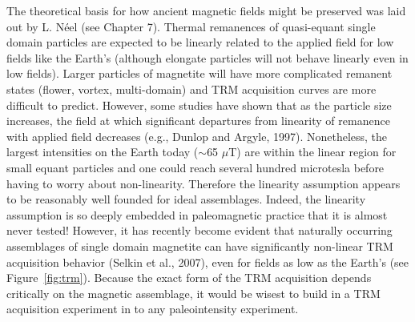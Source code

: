   The  theoretical basis for how ancient magnetic fields might be preserved was laid out by   L.  N\'eel  (see Chapter 7).  Thermal remanences of quasi-equant single domain particles are expected to be linearly related to the applied field for low fields like the Earth's (although elongate particles will not behave linearly even in low fields).   Larger particles of magnetite   will have more complicated remanent states (flower, vortex, multi-domain)  and  TRM acquisition curves are more difficult to predict.  However, some studies have shown that as the particle size increases,  the field at which significant departures from linearity of remanence with applied field decreases (e.g., 
  Dunlop and Argyle,  1997).   \nocite{dunlop97b}   Nonetheless, the largest intensities on the Earth today ($\sim$65 $\mu$T) are within the linear region  for small equant particles and one could  reach several hundred microtesla before having to worry about non-linearity.    Therefore the linearity assumption  appears to be reasonably well founded for ideal assemblages.  Indeed, the linearity assumption is so deeply embedded in paleomagnetic practice that it is almost never tested! However,  it has recently become evident that naturally occurring assemblages of single domain magnetite can have significantly non-linear TRM acquisition behavior 
  (Selkin et al., 2007), \nocite{selkin07} even for fields as low as the  Earth's (see Figure~\ref{fig:trm}).  Because the exact form of the TRM acquisition depends critically on the magnetic assemblage,  it would be wisest to build in a TRM acquisition experiment in to any paleointensity experiment.  
  


